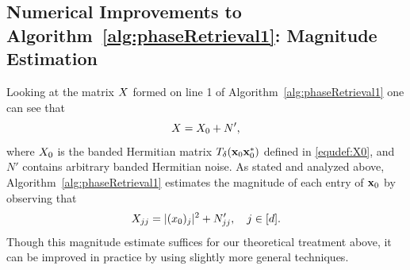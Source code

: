 \subsection{Numerical Improvements to Algorithm~\ref{alg:phaseRetrieval1}:  Magnitude Estimation}
\label{sec:MagEstImpNumerical}

Looking at the matrix $X$ formed on line 1 of Algorithm~\ref{alg:phaseRetrieval1} one can see that
$$X= X_0 + N',$$
where $X_0$ is the banded Hermitian matrix $T_\delta(\mathbf x_0 \mathbf x_0^*)$ defined in \eqref{equdef:X0}, and $N'$ contains arbitrary banded Hermitian noise.  As stated and analyzed above, Algorithm~\ref{alg:phaseRetrieval1} estimates the magnitude of each entry of $\mathbf x_0$ by observing that
$$X_{jj} = |(x_0)_{j}|^2 + N'_{jj}, \quad j \in [d].$$
Though this magnitude estimate suffices for our theoretical treatment above, it can be improved in practice by using slightly more general techniques.

